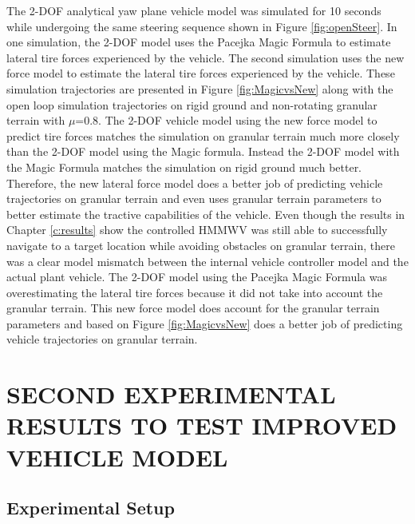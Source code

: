 \documentclass[12pt,onecolumn]{report}
\newcommand{\CHRONO}{{\sffamily{{Chrono}}}}
\begin{document}
The 2-DOF analytical yaw plane vehicle model was simulated for 10 seconds while undergoing the same steering sequence shown in Figure \ref{fig:openSteer}. In one simulation, the 2-DOF model uses the Pacejka Magic Formula to estimate lateral tire forces experienced by the vehicle. The second simulation uses the new force model to estimate the lateral tire forces experienced by the vehicle. These simulation trajectories are presented in Figure \ref{fig:MagicvsNew} along with the {\CHRONO} open loop simulation trajectories on rigid ground and non-rotating granular terrain with $\mu$=0.8. The 2-DOF vehicle model using the new force model to predict tire forces matches the {\CHRONO} simulation on granular terrain much more closely than the 2-DOF model using the Magic formula. Instead the 2-DOF model with the Magic Formula matches the {\CHRONO} simulation on rigid ground much better. Therefore, the new lateral force model does a better job of predicting vehicle trajectories on granular terrain and even uses granular terrain parameters to better estimate the tractive capabilities of the vehicle. Even though the results in Chapter \ref{c:results} show the controlled HMMWV was still able to successfully navigate to a target location while avoiding obstacles on granular terrain, there was a clear model mismatch between the internal vehicle controller model and the actual plant vehicle. The 2-DOF model using the Pacejka Magic Formula was overestimating the lateral tire forces because it did not take into account the granular terrain. This new force model does account for the granular terrain parameters and based on Figure \ref{fig:MagicvsNew} does a better job of predicting vehicle trajectories on granular terrain. 


\chapter{SECOND EXPERIMENTAL RESULTS TO TEST IMPROVED VEHICLE MODEL}\label{c:Exp2}

\section{Experimental Setup}\label{s:ExpSetup2}
\end{document}
